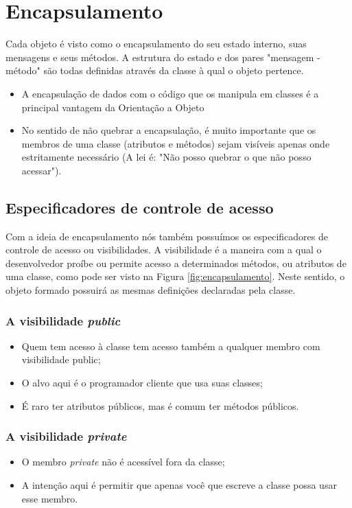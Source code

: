 \section{Encapsulamento}

Cada objeto é visto como o encapsulamento do seu estado interno, suas mensagens e seus métodos. A estrutura do estado e dos pares "mensagem - método" são todas definidas através da classe à qual o objeto pertence.

\begin{itemize}
  \item A encapsulação de dados com o código que os manipula em classes é a principal vantagem da Orientação a Objeto
  \item No sentido de não quebrar a encapsulação, é muito importante que os membros de uma classe (atributos e métodos) sejam visíveis apenas onde estritamente necessário (A lei é: "Não posso quebrar o que não posso acessar").
\end{itemize}

\subsection{Especificadores de controle de acesso}

Com a ideia de encapsulamento nós também possuímos os especificadores de controle de acesso ou visibilidades. A visibilidade é a maneira com a qual o desenvolvedor proíbe ou permite acesso a determinados métodos, ou atributos de uma classe, como pode ser visto na Figura \ref{fig:encapsulamento}. Neste sentido, o objeto formado possuirá as mesmas definições declaradas pela classe.

\subsubsection{A visibilidade \textit{public}}
\begin{itemize}
  \item Quem tem acesso à classe tem acesso também a qualquer membro com visibilidade public;
  \item O alvo aqui é o programador cliente que usa suas classes;
  \item É raro ter atributos públicos, mas é comum ter métodos públicos.
\end{itemize}

\subsubsection{A visibilidade \textit{private}}
\begin{itemize}
  \item O membro \textit{private} não é acessível fora da classe;
  \item A intenção aqui é permitir que apenas você que escreve a classe possa usar esse membro.
\end{itemize}

